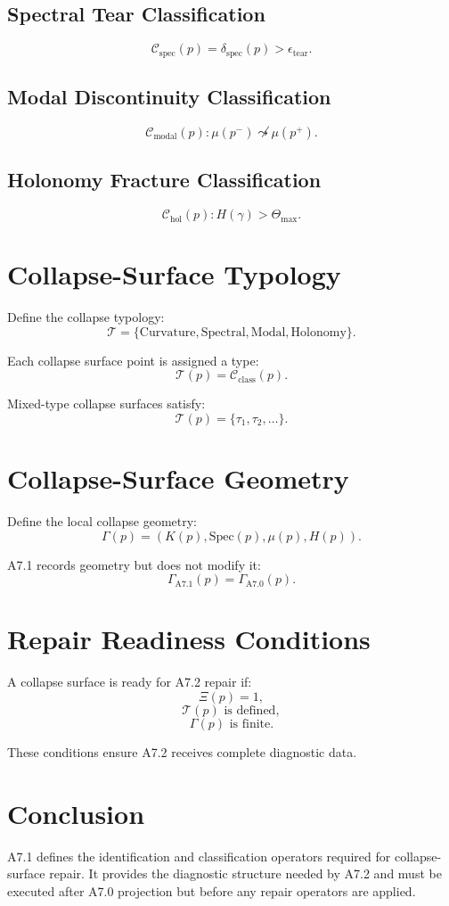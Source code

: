 \documentclass[11pt]{article}
\begin{document}
\subsection{Spectral Tear Classification}
\[
\mathcal{C}_{\mathrm{spec}}(p) =
\delta_{\mathrm{spec}}(p) > \epsilon_{\mathrm{tear}}.
\]

\subsection{Modal Discontinuity Classification}
\[
\mathcal{C}_{\mathrm{modal}}(p) :
\mu(p^-) \not\leadsto \mu(p^+).
\]

\subsection{Holonomy Fracture Classification}
\[
\mathcal{C}_{\mathrm{hol}}(p) :
H(\gamma) > \Theta_{\max}.
\]

\section{Collapse-Surface Typology}

Define the collapse typology:
\[
\mathcal{T} =
\{\text{Curvature}, \text{Spectral}, \text{Modal}, \text{Holonomy}\}.
\]

Each collapse surface point is assigned a type:
\[
\mathcal{T}(p) =
\mathcal{C}_{\mathrm{class}}(p).
\]

Mixed-type collapse surfaces satisfy:
\[
\mathcal{T}(p) = \{\tau_1, \tau_2, \dots\}.
\]

\section{Collapse-Surface Geometry}

Define the local collapse geometry:
\[
\Gamma(p) = (K(p), \mathrm{Spec}(p), \mu(p), H(p)).
\]

A7.1 records geometry but does not modify it:
\[
\Gamma_{\mathrm{A7.1}}(p) = \Gamma_{\mathrm{A7.0}}(p).
\]

\section{Repair Readiness Conditions}

A collapse surface is ready for A7.2 repair if:
\[
\Xi(p) = 1,
\]
\[
\mathcal{T}(p) \text{ is defined},
\]
\[
\Gamma(p) \text{ is finite}.
\]

These conditions ensure A7.2 receives complete diagnostic data.

\section{Conclusion}

A7.1 defines the identification and classification operators required for
collapse-surface repair. It provides the diagnostic structure needed by
A7.2 and must be executed after A7.0 projection but before any repair
operators are applied.
\end{document}
